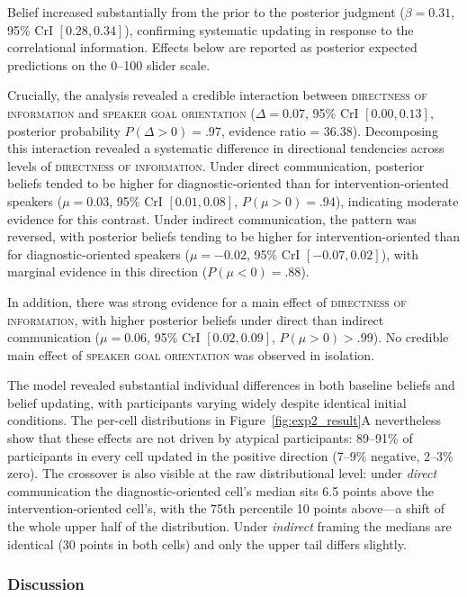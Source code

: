 \documentclass[10pt,letterpaper]{article}
\begin{document}
Belief increased substantially from the prior to the posterior judgment ($\beta = 0.31$, 95\% CrI $[0.28, 0.34]$), confirming systematic updating in response to the correlational information. Effects below are reported as posterior expected predictions on the 0--100 slider scale.

Crucially, the analysis revealed a credible interaction between \textsc{directness of information} and \textsc{speaker goal orientation} ($\Delta = 0.07$, 95\% CrI $[0.00, 0.13]$, posterior probability $P(\Delta > 0) = .97$, evidence ratio = 36.38). Decomposing this interaction revealed a systematic difference in directional tendencies across levels of \textsc{directness of information}. Under direct communication, posterior beliefs tended to be higher for diagnostic-oriented than for intervention-oriented speakers ($\mu = 0.03$, 95\% CrI $[0.01, 0.08]$, $P(\mu > 0) = .94$), indicating moderate evidence for this contrast. Under indirect communication, the pattern was reversed, with posterior beliefs tending to be higher for intervention-oriented than for diagnostic-oriented speakers ($\mu = -0.02$, 95\% CrI $[-0.07, 0.02]$), with marginal evidence in this direction ($P(\mu < 0) = .88$).

In addition, there was strong evidence for a main effect of \textsc{directness of information}, with higher posterior beliefs under direct than indirect communication ($\mu = 0.06$, 95\% CrI $[0.02, 0.09]$, $P(\mu > 0) > .99$). No credible main effect of \textsc{speaker goal orientation} was observed in isolation.

The model revealed substantial individual differences in both baseline beliefs and belief updating, with participants varying widely despite identical initial conditions. The per-cell distributions in Figure~\ref{fig:exp2_result}A nevertheless show that these effects are not driven by atypical participants: 89--91\% of participants in every cell updated in the positive direction (7--9\% negative, 2--3\% zero). The crossover is also visible at the raw distributional level: under \textit{direct} communication the diagnostic-oriented cell's median sits 6.5 points above the intervention-oriented cell's, with the 75th percentile 10 points above---a shift of the whole upper half of the distribution. Under \textit{indirect} framing the medians are identical (30 points in both cells) and only the upper tail differs slightly.

\subsubsection{Discussion}
\end{document}
